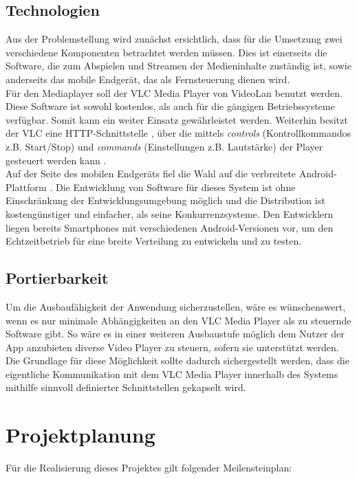 \documentclass[a4paper,12pt]{article}
\begin{document}
\subsection{Technologien}
Aus der Problemstellung wird zunächst ersichtlich, dass für die Umsetzung zwei verschiedene Komponenten betrachtet werden müssen. Dies ist einerseits die Software, die zum Abspielen und Streamen der Medieninhalte zuständig ist, sowie anderseits das mobile Endgerät, das als Fernsteuerung dienen wird. \\
Für den Mediaplayer soll der VLC Media Player von VideoLan \cite{VLC} benutzt werden. Diese Software ist sowohl kostenlos, als auch für die gängigen Betriebssysteme verfügbar. Somit kann ein weiter Einsatz gewährleistet werden. Weiterhin besitzt der VLC eine HTTP-Schnittstelle \cite{VLC:WebInterface}, über die mittels \textit{controls} (Kontrollkommandos z.B. Start/Stop) und \textit{commands} (Einstellungen z.B. Lautstärke) der Player gesteuert werden kann \cite{VLC:HowTo}. \\
Auf der Seite des mobilen Endgeräts fiel die Wahl auf die verbreitete Android-Plattform \cite{Android}. Die Entwicklung von Software für dieses System ist ohne Einschränkung der Entwicklungsumgebung möglich und die Distribution ist kostengünstiger und einfacher, als seine Konkurrenzsysteme. Den Entwicklern liegen bereits Smartphones mit verschiedenen Android-Versionen vor, um den Echtzeitbetrieb für eine breite Verteilung zu entwickeln und zu testen.

\subsection{Portierbarkeit}
Um die Ausbaufähigkeit der Anwendung sicherzustellen, wäre es wünschenswert, wenn es nur minimale Abhängigkeiten an den VLC Media Player als zu steuernde Software gibt. So wäre es in einer weiteren Ausbaustufe möglich dem Nutzer der App anzubieten diverse Video Player zu steuern, sofern sie unterstützt werden. Die Grundlage für diese Möglichkeit sollte dadurch sichergestellt werden, dass die eigentliche Kommunikation mit dem VLC Media Player innerhalb des Systems mithilfe sinnvoll definierter Schnittstellen gekapselt wird.

\newpage
\section{Projektplanung}

Für die Realisierung dieses Projektes gilt folgender Meilensteinplan:
\end{document}
